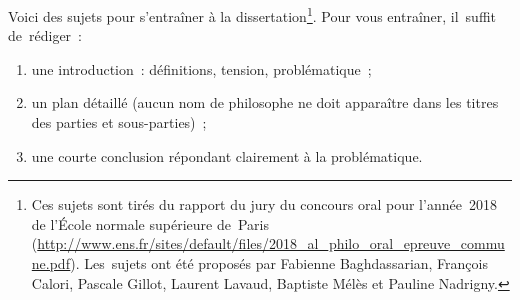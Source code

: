 \documentclass[a4paper,12pt]{article}
\begin{document}
Voici des sujets pour s'entraîner à la dissertation\footnote{Ces sujets sont tirés du rapport du jury du concours oral pour
l'année 2018 de l'École normale supérieure de Paris
(\url{http://www.ens.fr/sites/default/files/2018_al_philo_oral_epreuve_commune.pdf}).
Les sujets ont été proposés par Fabienne Baghdassarian, François Calori,
Pascale Gillot, Laurent Lavaud, Baptiste Mélès et Pauline Nadrigny.}. Pour vous
entraîner, il suffit de rédiger :

\begin{enumerate}
\item une introduction : définitions, tension, problématique ;

\item un plan détaillé (aucun nom de philosophe ne doit apparaître dans les
titres des parties et sous-parties) ;

\item une courte conclusion répondant clairement à la problématique.
\end{enumerate}
\end{document}
